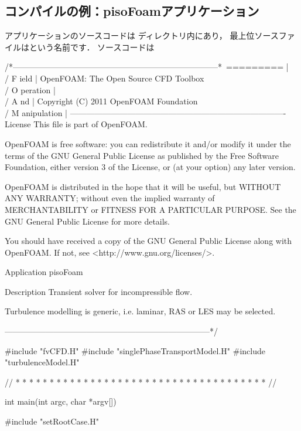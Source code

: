 \subsection{コンパイルの例：pisoFoamアプリケーション}
\label{ssec:3.2.4}
アプリケーションのソースコードは
ディレクトリ内にあり，
最上位ソースファイルはという名前です．
ソースコードは
\begin{OFverbatim}
/*---------------------------------------------------------------------------*\
  =========                 |
  \\      /  F ield         | OpenFOAM: The Open Source CFD Toolbox
   \\    /   O peration     |
    \\  /    A nd           | Copyright (C) 2011 OpenFOAM Foundation
     \\/     M anipulation  |
-------------------------------------------------------------------------------
License
    This file is part of OpenFOAM.

    OpenFOAM is free software: you can redistribute it and/or modify it
    under the terms of the GNU General Public License as published by
    the Free Software Foundation, either version 3 of the License, or
    (at your option) any later version.

    OpenFOAM is distributed in the hope that it will be useful, but WITHOUT
    ANY WARRANTY; without even the implied warranty of MERCHANTABILITY or
    FITNESS FOR A PARTICULAR PURPOSE.  See the GNU General Public License
    for more details.

    You should have received a copy of the GNU General Public License
    along with OpenFOAM.  If not, see <http://www.gnu.org/licenses/>.

Application
    pisoFoam

Description
    Transient solver for incompressible flow.

    Turbulence modelling is generic, i.e. laminar, RAS or LES may be selected.

\*---------------------------------------------------------------------------*/

#include "fvCFD.H"
#include "singlePhaseTransportModel.H"
#include "turbulenceModel.H"

// * * * * * * * * * * * * * * * * * * * * * * * * * * * * * * * * * * * * * //

int main(int argc, char *argv[])
{
    #include "setRootCase.H"

}
\end{OFverbatim}
